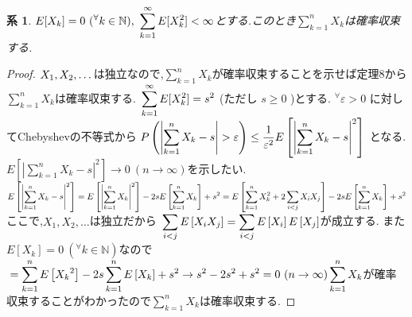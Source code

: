 \documentclass{jsarticle}
\newtheorem{cor}[thm]{系}
\begin{document}
\begin{cor}
$\displaystyle \\ E[X_{k}] = 0 \ ( {}^\forall k \in \mathbb{N} ), \ \sum_{k=1}^{\infty}E[X_{k}^{2}] < \infty$とする.このとき$\displaystyle \sum_{k=1}^{n}X_{ k }$は確率収束する.
\end{cor}
\begin{proof}
$\displaystyle \\ X_{1}, X_{2}, \dots$は独立なので,$\displaystyle \sum_{k=1}^{n}X_{ k }$が確率収束することを示せば定理8から$\displaystyle \sum_{k=1}^{n}X_{ k }$は確率収束する.
$\displaystyle \\ \sum_{k=1}^{\infty}E[X_{k}^{2}] = s^{2}$ (ただし $s \ge 0$ )とする. ${}^\forall \varepsilon > 0$ に対してChebyshevの不等式から $\displaystyle \\ P\left( \left| \sum_{k=1}^{n}X_{ k } - s \right| > \varepsilon \right) \le \frac{1}{ \varepsilon ^ {2} } E\left[ \left| \sum_{k=1}^{n}X_{ k } - s \right|^{2} \right]$ となる.
$\displaystyle E\left[ \left| \sum_{k=1}^{n}X_{ k } - s \right|^{2} \right] \to 0 \ (n \to \infty )$を示したい. $\displaystyle \\ E\left[ \left| \sum_{k=1}^{n}X_{ k } - s \right|^{2} \right] = E\left[ \left| \sum_{k=1}^{n}X_{ k } \right|^{2} \right] -2sE\left[ \sum_{k=1}^{n}X_{ k } \right] + s^{2} \\ = E\left[ \sum_{k=1}^{n}X_{ k }^{2} + 2 \sum_{i<j}X_{ i }X_{ j }  \right]-2sE\left[ \sum_{k=1}^{n}X_{ k } \right] + s^{2} $ここで,$\displaystyle X_{1}, X_{2}, \dots$は独立だから 
$\displaystyle \\ \sum_{i<j} E\left[ X_{ i }X_{ j }  \right] = \sum_{i<j} E\left[ X_{ i } \right] E\left[X_{ j }  \right]$が成立する. また$\displaystyle E[X_{k}] = 0 \ ( {}^\forall k \in \mathbb{N} )$なので
$\displaystyle \\ = \sum_{k=1}^{n} E\left[ {X_{ k }}^{2} \right] -2s\sum_{k=1}^{n} E\left[ X_{ k } \right] + s^{2} \to s^{2} -2s^{2}+s^{2}=0 \ (n \to \infty) \\ \sum_{k=1}^{n}X_{ k }$が確率収束することがわかったので$\displaystyle \sum_{k=1}^{n}X_{ k }$は確率収束する.
\end{proof}
\end{document}
